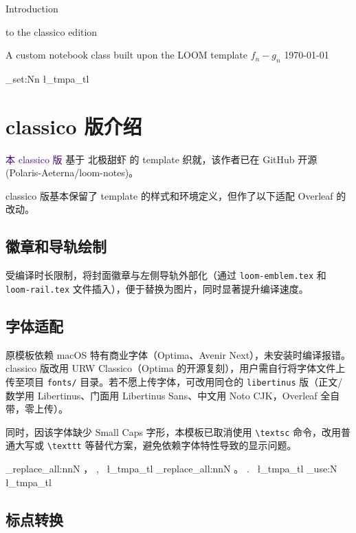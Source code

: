 \documentclass[cjk]{loom}
\newcommand{\enpunct}[1]{%
  \tl_set:Nn \l_tmpa_tl {#1}
  \regex_replace_all:nnN {，} {,\ } \l_tmpa_tl %
  \regex_replace_all:nnN {。} {.\ } \l_tmpa_tl %
  \tl_use:N \l_tmpa_tl
}
\begin{document}
\loomcover
  {Introduction \par to the classico edition}
  {A custom notebook class built upon the LOOM template}
  {$f_n-g_n$}
  {\today}

\enablerail

\newpage

{\small\tableofcontents}

\clearpage

\enpunct{

\section{classico 版介绍}

\textcolor{indigo}{本 classico 版} 基于 \textcolor{madder}{北极甜虾} 的 \textcolor{weld}{\text{LOOM} template} 织就，该作者已在 \textcolor{madder}{GitHub} 开源 \textcolor{selvage}{(Polaris-Aeterna/loom-notes)}。

classico 版基本保留了 \textcolor{weld}{\text{LOOM} template} 的样式和环境定义，但作了以下适配 \textcolor{selvage}{Overleaf} 的改动。

\subsection{徽章和导轨绘制}

受编译时长限制，将封面徽章与左侧导轨外部化（通过 \texttt{loom-emblem.tex} 和 \texttt{loom-rail.tex} 文件插入），便于替换为图片，同时显著提升编译速度。

\subsection{字体适配}

原模板依赖 macOS 特有商业字体（Optima、Avenir Next），未安装时编译报错。classico 版改用 URW Classico（Optima 的开源复刻），用户需自行将字体文件上传至项目 \texttt{fonts/} 目录。若不愿上传字体，可改用同仓的 \texttt{libertinus} 版（正文/数学用 Libertinus、门面用 Libertinus Sans、中文用 Noto CJK，Overleaf 全自带，零上传）。

同时，因该字体缺少 Small Caps 字形，本模板已取消使用 \texttt{\textbackslash textsc} 命令，改用普通大写或 \texttt{\textbackslash texttt} 等替代方案，避免依赖字体特性导致的显示问题。

}

\subsection{标点转换}
\end{document}
